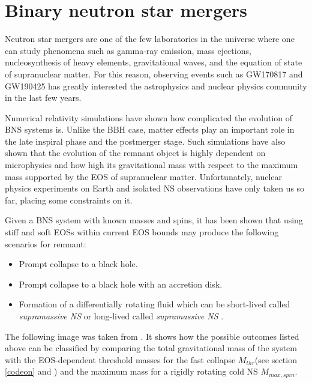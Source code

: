\chapter{Binary neutron star mergers}\label{BNS-merg}

Neutron star mergers are one of the few laboratories in the universe where one can study phenomena such as gamma-ray emission, mass ejections, nucleosynthesis of heavy elements, gravitational waves, and the equation of state of supranuclear matter. For this reason,  observing events such as GW170817 \cite{LIGOScientific:2017vwq} and GW190425 \cite{LIGOScientific:2020aai} has greatly interested the astrophysics and nuclear physics community in the last few years.
 
Numerical relativity simulations have shown how complicated the evolution of BNS systems is. Unlike the BBH case, matter effects play an important role in the late inspiral phase and the postmerger stage. Such simulations have also shown that the evolution of the remnant object is highly dependent on microphysics and how high its gravitational mass with respect to the maximum mass supported by the EOS of supranuclear matter. Unfortunately, nuclear physics experiments on Earth and isolated NS observations have only taken us so far, placing some constraints on it.

Given a BNS system with known masses and spins, it has been shown that using stiff and soft EOSs within current EOS bounds may produce the following scenarios for remnant:

\begin{itemize}
\item Prompt collapse to a black hole.
\item Prompt collapse to a black hole with an accretion disk.
\item Formation of a differentially rotating fluid which can be short-lived called \textit{supramassive NS} or long-lived called \textit{supramassive NS} \cite{Shibata:2019wef, Kastaun_2021}.
\end{itemize}


The following image was taken from \cite{Shibata:2019wef}. It shows how the possible outcomes listed above can be classified by comparing the total gravitational mass of the system with the EOS-dependent threshold masses for the fast collapse $M_{thr}$(see section \ref{codeon} and \cite{Kashyap_2022}) and the maximum mass for a rigidly rotating cold NS $M_{max,spin}$.



